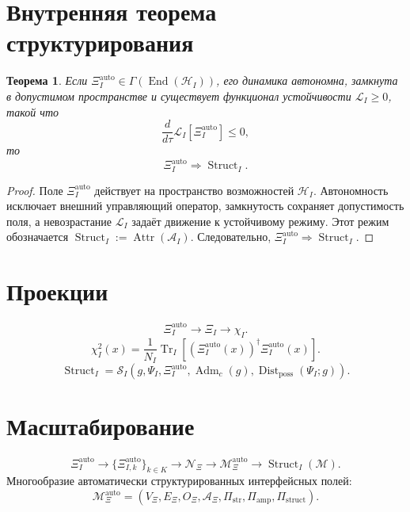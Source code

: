 \documentclass[12pt,a4paper]{article}
\newtheorem{theorem}{Теорема}
\DeclareMathOperator{\Adm}{Adm}
\DeclareMathOperator{\Struct}{Struct}
\DeclareMathOperator{\Dist}{Dist}
\DeclareMathOperator{\End}{End}
\DeclareMathOperator{\Tr}{Tr}
\DeclareMathOperator{\Attr}{Attr}
\newcommand{\M}{\mathcal M}
\newcommand{\Hcal}{\mathcal H}
\newcommand{\XiAuto}{\Xi_I^{\mathrm{auto}}}
\newcommand{\XiMan}{\mathcal M_{\Xi}^{\mathrm{auto}}}
\newcommand{\NXi}{\mathcal N_{\Xi}}
\newcommand{\PiAmp}{\Pi_{\mathrm{amp}}}
\newcommand{\PiStr}{\Pi_{\mathrm{str}}}
\newcommand{\PiStruct}{\Pi_{\mathrm{struct}}}
\begin{document}
\section{Внутренняя теорема структурирования}
\begin{theorem}
Если \(\XiAuto\in\Gamma(\End(\Hcal_I))\), его динамика автономна, замкнута в допустимом пространстве и существует функционал устойчивости \(\mathcal L_I\geq0\), такой что
\begin{equation}
\frac{d}{d\tau}\mathcal L_I[\XiAuto]\leq0,
\end{equation}
то
\begin{equation}
\boxed{\XiAuto\Rightarrow\Struct_I.}
\end{equation}
\end{theorem}

\begin{proof}
Поле \(\XiAuto\) действует на пространство возможностей \(\Hcal_I\). Автономность исключает внешний управляющий оператор, замкнутость сохраняет допустимость поля, а невозрастание \(\mathcal L_I\) задаёт движение к устойчивому режиму. Этот режим обозначается \(\Struct_I:=\Attr(\mathcal A_I)\). Следовательно, \(\XiAuto\Rightarrow\Struct_I\).
\end{proof}

\section{Проекции}
\begin{equation}
\boxed{\XiAuto\to\Xi_I\to\chi_I.}
\end{equation}
\begin{equation}
\boxed{\chi_I^2(x)=\frac{1}{N_I}\Tr_I\left[(\XiAuto(x))^\dagger\XiAuto(x)\right].}
\end{equation}
\begin{equation}
\boxed{\Struct_I=\mathcal S_I(g,\Psi_I,\XiAuto,\Adm_c(g),\Dist_{\mathrm{poss}}(\Psi_I;g)).}
\end{equation}

\section{Масштабирование}
\begin{equation}
\boxed{\XiAuto\to\{\Xi_{I,k}^{\mathrm{auto}}\}_{k\in K}\to\NXi\to\XiMan\to\Struct_I(\M).}
\end{equation}
Многообразие автоматически структурированных интерфейсных полей:
\begin{equation}
\boxed{\XiMan=(V_\Xi,E_\Xi,O_\Xi,\mathcal A_\Xi,\PiStr,\PiAmp,\PiStruct).}
\end{equation}
\end{document}
